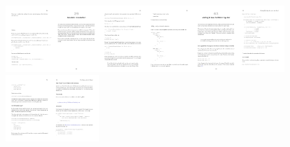 \begin{figure}
\begin{centering}
\includegraphics[height=2.51cm]{random-pages/random-pages-from-fpsimplified-pdf-00}\includegraphics[height=2.51cm]{random-pages/random-pages-from-fpsimplified-pdf-01}\includegraphics[height=2.51cm]{random-pages/random-pages-from-fpsimplified-pdf-02}\includegraphics[height=2.51cm]{random-pages/random-pages-from-fpsimplified-pdf-03}\includegraphics[height=2.51cm]{random-pages/random-pages-from-fpsimplified-pdf-04}\includegraphics[height=2.51cm]{random-pages/random-pages-from-fpsimplified-pdf-05}\includegraphics[height=2.51cm]{random-pages/random-pages-from-fpsimplified-pdf-06}\includegraphics[height=2.51cm]{random-pages/random-pages-from-fpsimplified-pdf-07}

\end{centering}
\end{figure}
